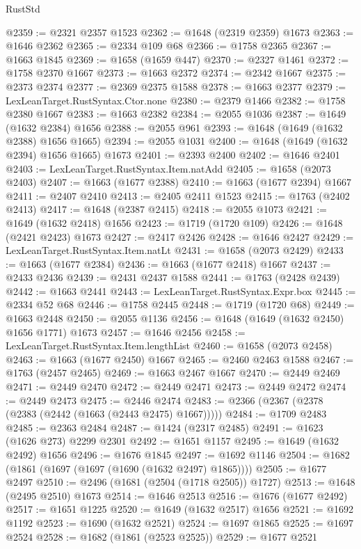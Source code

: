 \begin{lexlean}{RustStd}
\begin{coremodule}
@2359 := @2321 @2357 @1523
@2362 := @1648 (@2319 @2359) @1673
@2363 := @1646 @2362
@2365 := @2334 @109 @68
@2366 := @1758 @2365
@2367 := @1663 @1845
@2369 := @1658 (@1659 @447)
@2370 := @2327 @1461
@2372 := @1758 @2370 @1667
@2373 := @1663 @2372
@2374 := @2342 @1667
@2375 := @2373 @2374
@2377 := @2369 @2375 @1588
@2378 := @1663 @2377
@2379 := LexLeanTarget.RustSyntax.Ctor.none
@2380 := @2379 @1466
@2382 := @1758 @2380 @1667
@2383 := @1663 @2382
@2384 := @2055 @1036
@2387 := @1649 (@1632 @2384) @1656
@2388 := @2055 @961
@2393 := @1648 (@1649 (@1632 @2388) @1656 @1665)
@2394 := @2055 @1031
@2400 := @1648 (@1649 (@1632 @2394) @1656 @1665) @1673
@2401 := @2393 @2400
@2402 := @1646 @2401
@2403 := LexLeanTarget.RustSyntax.Item.natAdd
@2405 := @1658 (@2073 @2403)
@2407 := @1663 (@1677 @2388)
@2410 := @1663 (@1677 @2394) @1667
@2411 := @2407 @2410
@2413 := @2405 @2411 @1523
@2415 := @1763 (@2402 @2413)
@2417 := @1648 (@2387 @2415)
@2418 := @2055 @1073
@2421 := @1649 (@1632 @2418) @1656
@2423 := @1719 (@1720 @109)
@2426 := @1648 (@2421 @2423) @1673
@2427 := @2417 @2426
@2428 := @1646 @2427
@2429 := LexLeanTarget.RustSyntax.Item.natLt
@2431 := @1658 (@2073 @2429)
@2433 := @1663 (@1677 @2384)
@2436 := @1663 (@1677 @2418) @1667
@2437 := @2433 @2436
@2439 := @2431 @2437 @1588
@2441 := @1763 (@2428 @2439)
@2442 := @1663 @2441
@2443 := LexLeanTarget.RustSyntax.Expr.box
@2445 := @2334 @52 @68
@2446 := @1758 @2445
@2448 := @1719 (@1720 @68)
@2449 := @1663 @2448
@2450 := @2055 @1136
@2456 := @1648 (@1649 (@1632 @2450) @1656 @1771) @1673
@2457 := @1646 @2456
@2458 := LexLeanTarget.RustSyntax.Item.lengthList
@2460 := @1658 (@2073 @2458)
@2463 := @1663 (@1677 @2450) @1667
@2465 := @2460 @2463 @1588
@2467 := @1763 (@2457 @2465)
@2469 := @1663 @2467 @1667
@2470 := @2449 @2469
@2471 := @2449 @2470
@2472 := @2449 @2471
@2473 := @2449 @2472
@2474 := @2449 @2473
@2475 := @2446 @2474
@2483 := @2366 (@2367 (@2378 (@2383 (@2442 (@1663 (@2443 @2475) @1667)))))
@2484 := @1709 @2483
@2485 := @2363 @2484
@2487 := @1424 (@2317 @2485)
@2491 := @1623 (@1626 @273) @2299 @2301
@2492 := @1651 @1157
@2495 := @1649 (@1632 @2492) @1656
@2496 := @1676 @1845
@2497 := @1692 @1146
@2504 := @1682 (@1861 (@1697 (@1697 (@1690 (@1632 @2497) @1865))))
@2505 := @1677 @2497
@2510 := @2496 (@1681 (@2504 (@1718 @2505)) @1727)
@2513 := @1648 (@2495 @2510) @1673
@2514 := @1646 @2513
@2516 := @1676 (@1677 @2492)
@2517 := @1651 @1225
@2520 := @1649 (@1632 @2517) @1656
@2521 := @1692 @1192
@2523 := @1690 (@1632 @2521)
@2524 := @1697 @1865
@2525 := @1697 @2524
@2528 := @1682 (@1861 (@2523 @2525))
@2529 := @1677 @2521

\end{coremodule}
\end{lexlean}
